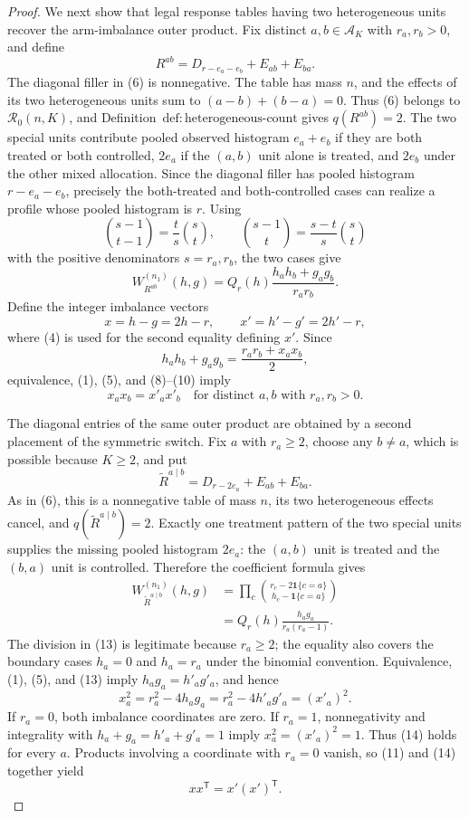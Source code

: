 \documentclass{article}
\begin{document}
\begin{proof}
We next show that legal response tables having two heterogeneous units recover the arm-imbalance outer product.  Fix distinct \(a,b\in\mathcal A_K\) with \(r_a,r_b>0\), and define
\[
 R^{ab}=D_{r-e_a-e_b}+E_{ab}+E_{ba}.
 \tag{6}
\]
The diagonal filler in (6) is nonnegative.  The table has mass \(n\), and the effects of its two heterogeneous units sum to \((a-b)+(b-a)=0\).  Thus (6) belongs to \(\mathcal R_0(n,K)\), and Definition~\(\mathrm{def:heterogeneous\mbox{-}count}\) gives \(q(R^{ab})=2\).  The two special units contribute pooled observed histogram \(e_a+e_b\) if they are both treated or both controlled, \(2e_a\) if the \((a,b)\) unit alone is treated, and \(2e_b\) under the other mixed allocation.  Since the diagonal filler has pooled histogram \(r-e_a-e_b\), precisely the both-treated and both-controlled cases can realize a profile whose pooled histogram is \(r\).  Using
\[
 \binom{s-1}{t-1}=\frac{t}{s}\binom{s}{t},
 \qquad
 \binom{s-1}{t}=\frac{s-t}{s}\binom{s}{t}
 \tag{7}
\]
with the positive denominators \(s=r_a,r_b\), the two cases give
\[
 W_{R^{ab}}^{(n_1)}(h,g)
 =Q_r(h)\frac{h_ah_b+g_ag_b}{r_ar_b}.
 \tag{8}
\]
Define the integer imbalance vectors
\[
 x=h-g=2h-r,
 \qquad
 x'=h'-g'=2h'-r,
 \tag{9}
\]
where (4) is used for the second equality defining \(x'\).  Since
\[
 h_ah_b+g_ag_b=\frac{r_ar_b+x_ax_b}{2},
 \tag{10}
\]
equivalence, (1), (5), and (8)--(10) imply
\[
 x_ax_b=x'_ax'_b
 \quad\text{for distinct }a,b\text{ with }r_a,r_b>0.
 \tag{11}
\]

The diagonal entries of the same outer product are obtained by a second placement of the symmetric switch.  Fix \(a\) with \(r_a\geq2\), choose any \(b\neq a\), which is possible because \(K\geq2\), and put
\[
 \widetilde R^{a\mid b}=D_{r-2e_a}+E_{ab}+E_{ba}.
 \tag{12}
\]
As in (6), this is a nonnegative table of mass \(n\), its two heterogeneous effects cancel, and \(q(\widetilde R^{a\mid b})=2\).  Exactly one treatment pattern of the two special units supplies the missing pooled histogram \(2e_a\): the \((a,b)\) unit is treated and the \((b,a)\) unit is controlled.  Therefore the coefficient formula gives
\[
 \begin{aligned}
 W_{\widetilde R^{a\mid b}}^{(n_1)}(h,g)
 &=\prod_c\binom{r_c-2\mathbf 1\{c=a\}}
                         {h_c-\mathbf 1\{c=a\}}\\
 &=Q_r(h)\frac{h_ag_a}{r_a(r_a-1)}.
 \end{aligned}
 \tag{13}
\]
The division in (13) is legitimate because \(r_a\geq2\); the equality also covers the boundary cases \(h_a=0\) and \(h_a=r_a\) under the binomial convention.  Equivalence, (1), (5), and (13) imply \(h_ag_a=h'_ag'_a\), and hence
\[
 x_a^2=r_a^2-4h_ag_a=r_a^2-4h'_ag'_a=(x'_a)^2.
 \tag{14}
\]
If \(r_a=0\), both imbalance coordinates are zero.  If \(r_a=1\), nonnegativity and integrality with \(h_a+g_a=h'_a+g'_a=1\) imply \(x_a^2=(x'_a)^2=1\).  Thus (14) holds for every \(a\).  Products involving a coordinate with \(r_a=0\) vanish, so (11) and (14) together yield
\[
 xx^{\mathsf T}=x'(x')^{\mathsf T}.
 \tag{15}
\]


\end{proof}
\end{document}
